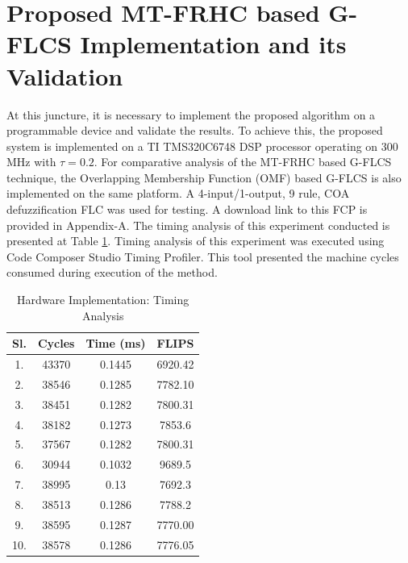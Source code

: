 \section{Proposed MT-FRHC based G-FLCS Implementation and its Validation}
At this juncture, it is necessary to implement the proposed algorithm on a programmable device and validate the results. To achieve this, the proposed system is implemented on a TI TMS320C6748 DSP processor operating on 300 MHz with $ \tau = 0.2 $. For comparative analysis of the MT-FRHC based G-FLCS technique, the Overlapping Membership Function (OMF) based G-FLCS is also implemented on the same platform. A 4-input/1-output, 9 rule, COA defuzzification FLC was used for testing. A download link to this FCP is provided in Appendix-A. The timing analysis of this experiment conducted is presented at Table \ref{tab:ch2timing}. Timing analysis of this experiment was executed using Code Composer Studio Timing Profiler. This tool presented the machine cycles consumed during execution of the method. 

\begin{table}[h]
	\centering
	\caption{Hardware Implementation: Timing Analysis}
	\label{tab:ch2timing}
	\begin{tabular}{cccc}
		\hline \noalign{\vskip 1mm} 
		Sl. & Cycles & Time (ms) & FLIPS \\ \hline \noalign{\vskip 1mm} 
		1. & 43370 & 0.1445 & 6920.42 \\
		2. & 38546 & 0.1285 & 7782.10 \\
		3. & 38451 & 0.1282 & 7800.31 \\
		4. & 38182 & 0.1273 & 7853.6 \\
		5. & 37567 & 0.1282 & 7800.31 \\
		6. & 30944 & 0.1032 & 9689.5 \\
		7. & 38995 & 0.13 & 7692.3 \\
		8. & 38513 & 0.1286 & 7788.2 \\
		9. & 38595 & 0.1287 & 7770.00 \\
		10. & 38578 & 0.1286 & 7776.05 \\ \hline
	\end{tabular}
\end{table}

